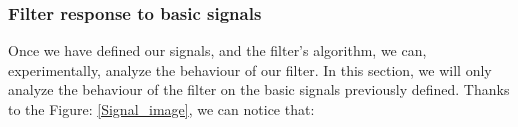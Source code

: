 \documentclass[a4paper,10pt]{article}
\begin{document}
            
	
	\subsubsection{Filter response to basic signals}
	Once we have defined our signals, and the filter's algorithm, we can, experimentally, analyze the behaviour of our filter.  In this section, we will only analyze the behaviour of the filter on the basic signals previously defined.  Thanks to the Figure: \ref{Signal_image}, we can notice that:
	\begin{figure}[!htb]\centering
	  \begin{minipage}{0.45\textwidth}  \end{minipage}
	  \begin{minipage}{0.45\textwidth}  \end{minipage}

\end{figure}
\end{document}
